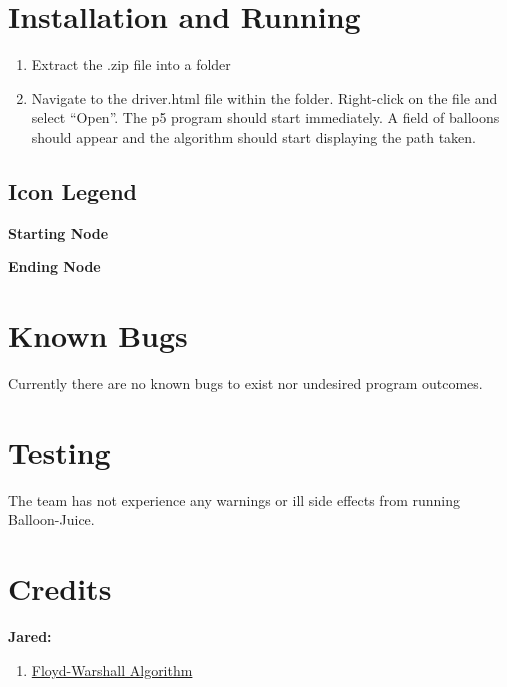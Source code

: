\documentclass{article}
\begin{document}
\section{Installation and Running}

\begin{enumerate}
\item Extract the .zip file into a folder
\item Navigate to the driver.html file within the folder. Right-click on the file and select “Open”. The p5 program should start immediately. A field of balloons should appear and the algorithm should start displaying the path taken.
\end{enumerate}

\subsection{Icon Legend}

\begin{center}
\large \textbf{Starting Node}


\end{center}

\vspace*{7px}

\begin{center}
\large \textbf{Ending Node}


\end{center}

\section{Known Bugs}

Currently there are no known bugs to exist nor undesired program outcomes.

\section{Testing}

The team has not experience any warnings or ill side effects from running Balloon-Juice.

\newpage

\section{Credits}

\begin{flushleft}
\textbf{Jared:}

\begin{enumerate}
\item \href{https://en.wikipedia.org/wiki/Floyd-Warshall_algorithm}{Floyd-Warshall Algorithm}
\end{enumerate}
\end{flushleft}
\end{document}
